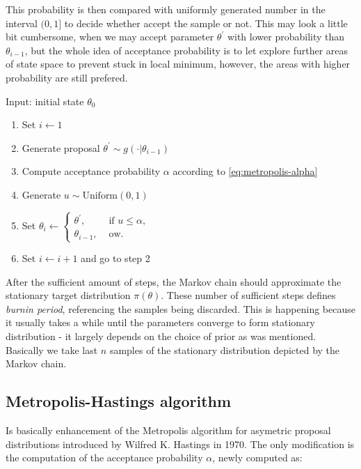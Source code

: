 \documentclass[
  digital, %
  oneside, %
  lof,     %
  lot,     %
]{fithesis4}
\begin{document}
This probability is then compared with uniformly generated number in
the interval $(0, 1]$ to decide whether accept the 
sample or not. This may look a little bit cumbersome, 
when we may accept parameter $\theta^\prime$ with 
lower probability than $\theta_{i-1}$, but the 
whole idea of acceptance probability is to let 
explore further areas of state space to prevent 
stuck in local minimum, however, the areas with 
higher probability are still prefered.


Input: initial state $\theta_0$

\begin{enumerate}
  \item Set $i \leftarrow 1$
  \item Generate proposal $\theta^\prime \sim g(\cdot | \theta_{i-1})$
  \item Compute acceptance probability $\alpha$ according to \eqref{eq:metropolis-alpha}
  \item Generate $u \sim \text{Uniform}(0, 1)$
  \item Set $\theta_{i} \leftarrow \begin{cases}
    \theta^\prime, & \text{ if } u \leq \alpha,\\
    \theta_{i-1}, & \text{ ow.}
    \end{cases}
    $
  \item Set $i \leftarrow i + 1$ and go to step 2
\end{enumerate}


After the sufficient amount of steps, the Markov 
chain should approximate the stationary target 
distribution $\pi(\theta)$. These number of 
sufficient steps defines \textit{burnin period}, 
referencing the samples being discarded. This 
is happening because it usually takes a while 
until the parameters converge to form 
stationary distribution - it largely 
depends on the choice of prior as was mentioned. 
Basically we take last $n$ samples of the 
stationary distribution depicted by the 
Markov chain.


\subsection{Metropolis-Hastings algorithm}

Is basically enhancement of the Metropolis algorithm 
for asymetric proposal distributions introduced by 
Wilfred K. Hastings in 1970. 
The only modification is the computation of the acceptance 
probability $\alpha$, newly computed as:
\end{document}
